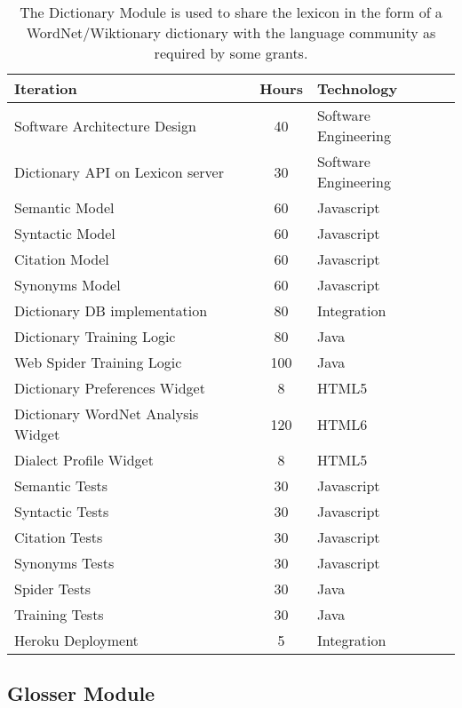 \documentclass[12 pt]{article}
\begin{document}
\footnotesize
\begin{table}[htbp]
\begin{center}
  \begin{tabular}{ | lcl | }
\hline

Iteration&	Hours&	Technology	\\
\hline
Software Architecture Design&	40&	Software Engineering	\\ 
Dictionary API on Lexicon server&	30&	Software Engineering\\ 
Semantic Model&	60&	Javascript	\\ 
Syntactic Model&	60&	Javascript	\\ 
Citation Model&	60&	Javascript	\\ 
Synonyms Model&	60&	Javascript	\\ 
Dictionary DB implementation&	80&	Integration	\\ 
Dictionary Training Logic&	80&	Java	\\ 
Web Spider Training Logic&	100&	Java	\\ 
Dictionary Preferences Widget&	8&	HTML5	\\ 
Dictionary WordNet Analysis Widget&	120&	HTML6	\\ 
Dialect Profile Widget&	8&	HTML5 \\ 
Semantic Tests&	30&	Javascript	\\ 
Syntactic Tests&	30&  Javascript \\ 
Citation Tests&	         30&  Javascript \\ 
Synonyms Tests&	30&  Javascript \\ 
Spider Tests&	30&	Java \\ 
Training Tests&	30&	Java	\\ 
Heroku Deployment&	5&  Integration \\ 
\hline
  \end{tabular}
 \caption{The Dictionary Module is used to share the lexicon in the form of a WordNet/Wiktionary dictionary with the language community as required by some grants.}
  \label{tab:label}
  \end{center}
\end{table}


\newpage
\subsection{Glosser Module}
\end{document}
